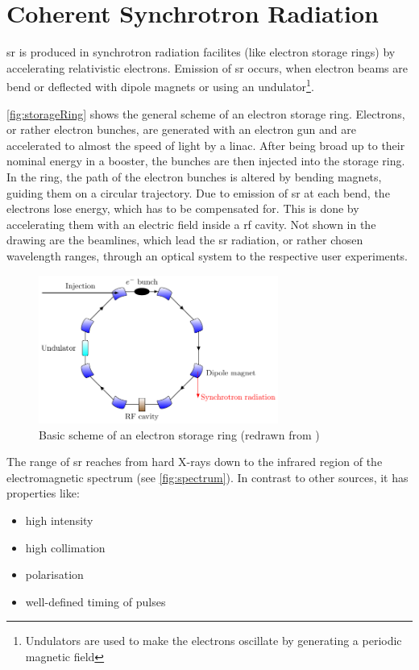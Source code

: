 \section{Coherent Synchrotron Radiation}
\Gls{sr} is produced in synchrotron radiation facilites (like electron storage rings) by accelerating relativistic electrons.
Emission of \gls{sr} occurs, when electron beams are bend or deflected with dipole magnets or using an undulator\footnote{Undulators are used to make the electrons oscillate by generating a periodic magnetic field}. 

\autoref{fig:storageRing} shows the general scheme of an electron storage ring.
Electrons, or rather electron bunches, are generated with an electron gun and are accelerated to almost the speed of light by a \gls{linac}.
After being broad up to their nominal energy in a booster, the bunches are then injected into the storage ring.
In the ring, the path of the electron bunches is altered by bending magnets, guiding them on a circular trajectory.
Due to emission of \gls{sr} at each bend, the electrons lose energy, which has to be compensated for.
This is done by accelerating them with an electric field inside a \gls{rf} cavity.
Not shown in the drawing are the beamlines, which lead the \gls{sr} radiation, or rather chosen wavelength ranges, through an optical system to the respective user experiments. \cite{roussel2014} \cite{rota2018}

\begin{figure}[tbh]
 	\centering
 	\includegraphics[width=0.7\textwidth]{chap/02-theory/img/synchrotron}
 	\caption{Basic scheme of an electron storage ring (redrawn from \cite{roussel2014})}
 	\label{fig:storageRing}
\end{figure}
 
 
The range of \gls{sr} reaches from hard X-rays down to the infrared region of the electromagnetic spectrum (see \autoref{fig:spectrum}). In contrast to other sources, it has properties like:
\begin{itemize}[noitemsep]
	\item high intensity 
	\item high collimation
	\item polarisation
	\item well-defined timing of pulses
\end{itemize}

